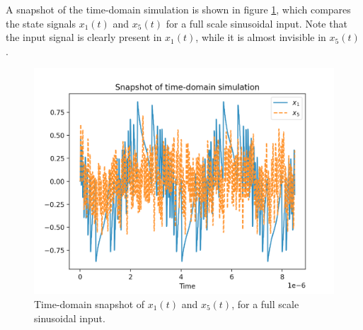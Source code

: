 A snapshot of the time-domain simulation is shown in figure \ref{fig:snapshot_x1x5}, which compares the state signals $x_1(t)$ and $x_5(t)$ for a full scale sinusoidal input. Note that the input signal is clearly present in $x_1(t)$, while it is almost invisible in $x_5(t)$.
\begin{figure}[htbp]
    \centering
    \includegraphics[width=\linewidth]{figures/051chain/CI_time_x1x5.png}
    \caption{Time-domain snapshot of $x_1(t)$ and $x_5(t)$, for a full scale sinusoidal input.}
    \label{fig:snapshot_x1x5}
\end{figure}

